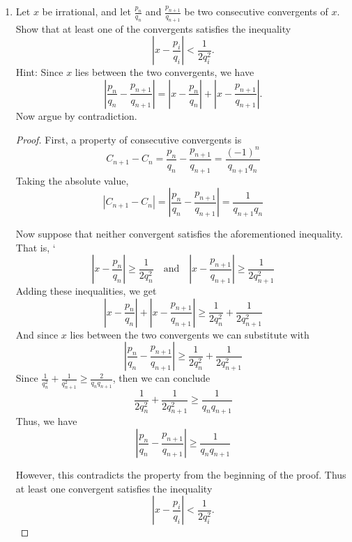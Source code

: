 \documentclass[11pt]{article}
\theoremstyle{definition}
\begin{document}
\begin{enumerate}
\begin{enumerate}
\begin{proof}
            So, one solution is $(x_2, y_2) = (449,120)$

            For $n=3$:
            \begin{align*}
                (15+4\sqrt{14})^3 &= (449 + 120\sqrt{14})(15+4\sqrt{14}) \\
                &= 6735 + 3596\sqrt{14} + 6720 \\
                &= 13455 + 3596\sqrt{14}
            \end{align*}
            So, another solution is $(x_3, y_3) = (13455,3596)$
        \end{proof}
    
    \end{enumerate}
    \item Let $x$ be irrational, and let $\frac{p_n}{q_n}$ and $\frac{p_{n+1}}{q_{n+1}}$ be two consecutive convergents of $x$. Show that at least one of the convergents satisfies the inequality
    $$ \left\lvert x - \frac{p_i}{q_i} \right\rvert < \frac{1}{2q_i^2}. $$ Hint: Since $x$ lies between the two convergents, we have $$\left\lvert \frac{p_n}{q_n} - \frac{p_{n+1}}{q_{n+1}} \right\rvert = \left\lvert x - \frac{p_n}{q_n} \right\rvert + \left\lvert x - \frac{p_{n+1}}{q_{n+1}} \right\rvert.$$ Now argue by contradiction.
    \begin{proof}
        First, a property of consecutive convergents is 
        \[
            C_{n+1} - C_n = \frac{p_n}{q_n} - \frac{p_{n+1}}{q_{n+1}} = \frac{(-1)^n}{q_{n+1}q_n}
        \]
        Taking the absolute value, 
        \[
            \left\lvert C_{n+1} - C_n \right\rvert = \left\lvert \frac{p_n}{q_n} - \frac{p_{n+1}}{q_{n+1}} \right\rvert = \frac{1}{q_{n+1}q_n}
        \]

        Now suppose that neither convergent satisfies the aforementioned inequality. That is, 
    `   \[
            \left\lvert x - \frac{p_n}{q_n} \right\rvert \ge \frac{1}{2q_n^2} \quad\text{and}\quad \left\lvert x - \frac{p_{n+1}}{q_{n+1}} \right\rvert \ge \frac{1}{2q_{n+1}^2}
        \]
        Adding these inequalities, we get 
        \[
            \left\lvert x - \frac{p_n}{q_n} \right\rvert + \left\lvert x - \frac{p_{n+1}}{q_{n+1}} \right\rvert \ge \frac{1}{2q_n^2} + \frac{1}{2q_{n+1}^2} 
        \]
        And since $x$ lies between the two convergents we can substitute with 
        \[
            \left\lvert \frac{p_n}{q_n} - \frac{p_{n+1}}{q_{n+1}} \right\rvert \ge \frac{1}{2q_n^2} + \frac{1}{2q_{n+1}^2}
        \]
        Since $\frac{1}{q_n^2} + \frac{1}{q_{n+1}^2} \ge \frac{2}{q_nq_{n+1}}$, then we can conclude
        \[
            \frac{1}{2q_n^2} + \frac{1}{2q_{n+1}^2} \ge \frac{1}{q_nq_{n+1}}
        \]
        Thus, we have 
        \[
            \left\lvert \frac{p_n}{q_n} - \frac{p_{n+1}}{q_{n+1}} \right\rvert \ge \frac{1}{q_nq_{n+1}}
        \]

        However, this contradicts the property from the beginning of the proof. 
        Thus at least one convergent satisfies the inequality
        $$ \left\lvert x - \frac{p_i}{q_i} \right\rvert < \frac{1}{2q_i^2}. $$
    \end{proof}

\end{enumerate}
\end{document}
